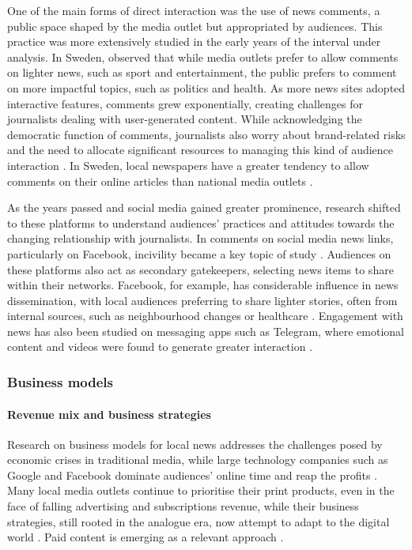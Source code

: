 \documentclass[english]{textolivre}
\begin{document}
One of the main forms of direct interaction was the use of news comments, a public space shaped by the media outlet but appropriated by audiences. This practice was more extensively studied in the early years of the interval under analysis. In Sweden, \textcite{almgren2015} observed that while media outlets prefer to allow comments on lighter news, such as sport and entertainment, the public prefers to comment on more impactful topics, such as politics and health. As more news sites adopted interactive features, comments grew exponentially, creating challenges for journalists dealing with user-generated content. While acknowledging the democratic function of comments, journalists also worry about brand-related risks and the need to allocate significant resources to managing this kind of audience interaction \cite{canter2013}. In Sweden, local newspapers have a greater tendency to allow comments on their online articles than national media outlets \cite{almgren2016}.

As the years passed and social media gained greater prominence, research shifted to these platforms to understand audiences’ practices and attitudes towards the changing relationship with journalists. In comments on social media news links, particularly on Facebook, incivility became a key topic of study \cite{kim2023}. Audiences on these platforms also act as secondary gatekeepers, selecting news items to share within their networks. Facebook, for example, has considerable influence in news dissemination, with local audiences preferring to share lighter stories, often from internal sources, such as neighbourhood changes or healthcare \cite{almgren2017}. Engagement with news has also been studied on messaging apps such as Telegram, where emotional content and videos were found to generate greater interaction \cite{hradziushka2023}.

\subsubsection{Business models}

\paragraph{Revenue mix and business strategies}

Research on business models for local news addresses the challenges posed by economic crises in traditional media, while large technology companies such as Google and Facebook dominate audiences’ online time and reap the profits \cite{hindman2018}. Many local media outlets continue to prioritise their print products, even in the face of falling advertising and subscriptions revenue, while their business strategies, still rooted in the analogue era, now attempt to adapt to the digital world \cite{jenkins2020a,cestino2023}. Paid content is emerging as a relevant approach \cite{jenkins2023}.
\end{document}
